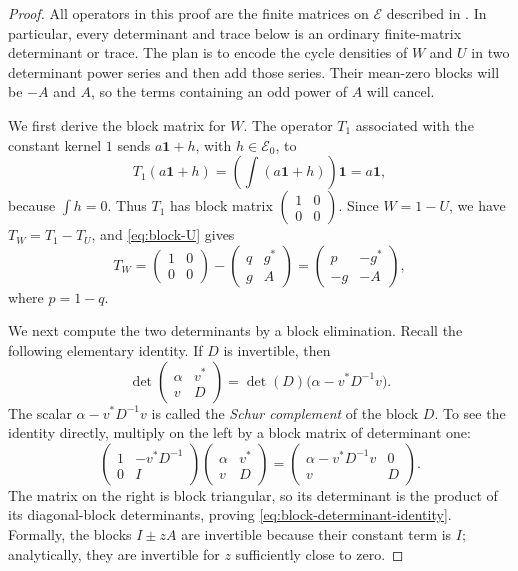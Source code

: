 \documentclass[11pt]{article}
\newcommand{\one}{\mathbf 1}
\begin{document}
\begin{proof}
All operators in this proof are the finite matrices on \(\mathcal E\)
described in .  In particular, every determinant
and trace below is an ordinary finite-matrix determinant or trace.
The plan is to encode the cycle densities of \(W\) and \(U\) in two
determinant power series and then add those series.  Their mean-zero blocks
will be \(-A\) and \(A\), so the terms containing an odd power of \(A\)
will cancel.

We first derive the block matrix for \(W\).  The operator \(T_1\) associated
with the constant kernel \(1\) sends \(a\one+h\), with
\(h\in\mathcal E_0\), to
\[
       T_1(a\one+h)=\left(\int(a\one+h)\right)\one=a\one,
\]
because \(\int h=0\).  Thus \(T_1\) has block matrix
\(\left(\begin{smallmatrix}1&0\\0&0\end{smallmatrix}\right)\).  Since
\(W=1-U\), we have \(T_W=T_1-T_U\), and \eqref{eq:block-U} gives
\[
 T_W=
 \begin{pmatrix}1&0\\0&0\end{pmatrix}
 -
 \begin{pmatrix}q&g^*\\g&A\end{pmatrix}
 =
 \begin{pmatrix}p&-g^*\\-g&-A\end{pmatrix},
\]
where \(p=1-q\).

We next compute the two determinants by a block elimination.  Recall the
following elementary identity.  If \(D\) is invertible, then
\begin{equation}\label{eq:block-determinant-identity}
 \det\begin{pmatrix}\alpha&v^*\\v&D\end{pmatrix}
 =\det(D)\bigl(\alpha-v^*D^{-1}v\bigr).
\end{equation}
The scalar \(\alpha-v^*D^{-1}v\) is called the \emph{Schur complement} of
the block \(D\).  To see the identity directly, multiply on the left by a
block matrix of determinant one:
\[
 \begin{pmatrix}1&-v^*D^{-1}\\0&I\end{pmatrix}
 \begin{pmatrix}\alpha&v^*\\v&D\end{pmatrix}
 =\begin{pmatrix}\alpha-v^*D^{-1}v&0\\v&D\end{pmatrix}.
\]
The matrix on the right is block triangular, so its determinant is the
product of its diagonal-block determinants, proving
\eqref{eq:block-determinant-identity}.  Formally, the blocks
\(I\pm zA\) are invertible because their constant term is \(I\); analytically,
they are invertible for \(z\) sufficiently close to zero.


\end{proof}
\end{document}
